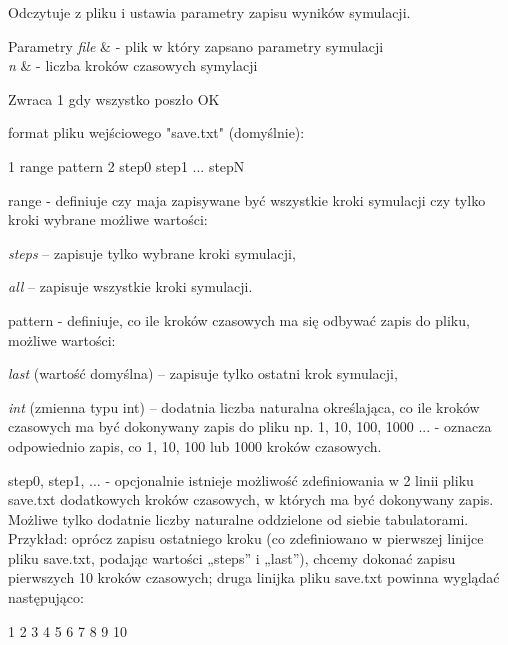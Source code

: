 Odczytuje z pliku i ustawia parametry zapisu wyników symulacji. 


\begin{DoxyParams}{Parametry}
{\em file} & -\/ plik w który zapsano parametry symulacji \\
\hline
{\em n} & -\/ liczba kroków czasowych symylacji \\
\hline
\end{DoxyParams}
\begin{DoxyReturn}{Zwraca}
1 gdy wszystko poszło O\+K
\end{DoxyReturn}

\begin{DoxyCode}
format pliku wejściowego \textcolor{stringliteral}{"save.txt"} (domyślnie): 
\end{DoxyCode}
 
\begin{DoxyCode}
1 range   pattern 
2 step0   step1   ... stepN 
\end{DoxyCode}


{\ttfamily range} -\/ definiuje czy maja zapisywane być wszystkie kroki symulacji czy tylko kroki wybrane możliwe wartości\+: 
\begin{DoxyItemize}
\item {\itshape steps} – zapisuje tylko wybrane kroki symulacji,  
\item {\itshape all} – zapisuje wszystkie kroki symulacji.  
\end{DoxyItemize}{\ttfamily pattern} -\/ definiuje, co ile kroków czasowych ma się odbywać zapis do pliku, możliwe wartości\+: 
\begin{DoxyItemize}
\item {\itshape last} (wartość domyślna) – zapisuje tylko ostatni krok symulacji, 
\item {\itshape int} (zmienna typu int) – dodatnia liczba naturalna określająca, co ile kroków czasowych ma być dokonywany zapis do pliku np. 1, 10, 100, 1000 ... -\/ oznacza odpowiednio zapis, co 1, 10, 100 lub 1000 kroków czasowych. 
\end{DoxyItemize}{\ttfamily step0}, {\ttfamily step1}, ... -\/ opcjonalnie istnieje możliwość zdefiniowania w 2 linii pliku save.\+txt dodatkowych kroków czasowych, w których ma być dokonywany zapis. Możliwe tylko dodatnie liczby naturalne oddzielone od siebie tabulatorami. Przykład\+: oprócz zapisu ostatniego kroku (co zdefiniowano w pierwszej linijce pliku save.\+txt, podając wartości „steps” i „last”), chcemy dokonać zapisu pierwszych 10 kroków czasowych; druga linijka pliku save.\+txt powinna wyglądać następująco\+: 
\begin{DoxyCode}
1   2   3   4   5   6   7   8   9   10
\end{DoxyCode}
 

